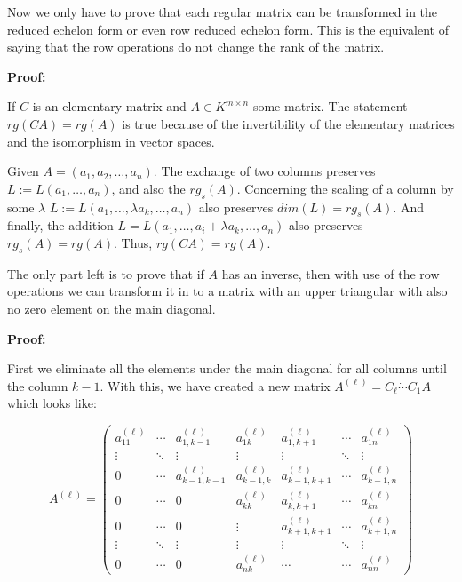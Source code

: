 \QED
\vspace{\baselineskip}

Now we only have to prove that each regular matrix can be transformed in the reduced echelon form or 
even row reduced echelon form. This is the equivalent of saying that the row operations do not change
the rank of the matrix.
\vspace{\baselineskip}

\textbf{Proof:}

If \(C\) is an elementary matrix and \(A \in K^{m \times n}\) some matrix. The statement \(rg(CA) = rg(A)\) 
is true because of the invertibility of the elementary matrices and the isomorphism in vector spaces.
\vspace{\baselineskip}

Given \(A = (a_1, a_2, \dots, a_n)\). The exchange of two columns preserves \(L := L(a_1, \dots, a_n)\), 
and also the \(rg_s (A)\). Concerning the scaling of a column by some \(\lambda \) \(L := L(a_1, \dots, \lambda a_k, \dots, a_n)\) 
also preserves \(dim(L) = rg_s(A)\). And finally, the addition \(L = L(a_1, \dots, a_i + \lambda a_k, \dots, a_n)\) also preserves 
\(rg_s (A) = rg(A)\). Thus, \(rg(CA) = rg(A)\).

\QED
\vspace{\baselineskip}

The only part left is to prove that if \(A\) has an inverse, then with use of the row operations we can 
transform it in to a matrix with an upper triangular with also no zero element on the main diagonal.
\vspace{\baselineskip}

\textbf{Proof:}

First we eliminate all the elements under the main diagonal for all columns until the column \(k - 1\).
With this, we have created a new matrix \(A^(\ell) = C_{\ell} \dot \cdots \dot C_1 A \) which looks 
like: 

\[
	A^{(\ell)} =
	\begin{pmatrix}
	a^{(\ell)}_{11} & \cdots & a^{(\ell)}_{1,k-1} & a^{(\ell)}_{1k} & a^{(\ell)}_{1,k+1} & \cdots & a^{(\ell)}_{1n} \\
	\vdots & \ddots & \vdots & \vdots & \vdots & \ddots & \vdots \\
	0 & \cdots & a^{(\ell)}_{k-1,k-1} & a^{(\ell)}_{k-1,k} & a^{(\ell)}_{k-1,k+1} & \cdots & a^{(\ell)}_{k-1,n} \\
	0 & \cdots & 0 & a^{(\ell)}_{kk} & a^{(\ell)}_{k,k+1} & \cdots & a^{(\ell)}_{kn} \\
	0 & \cdots & 0 & \vdots & a^{(\ell)}_{k+1,k+1} & \cdots & a^{(\ell)}_{k+1,n} \\
	\vdots & \ddots & \vdots & \vdots & \vdots & \ddots & \vdots \\
	0 & \cdots & 0 & a^{(\ell)}_{nk} & \cdots & \cdots & a^{(\ell)}_{nn}
	\end{pmatrix}
\]

